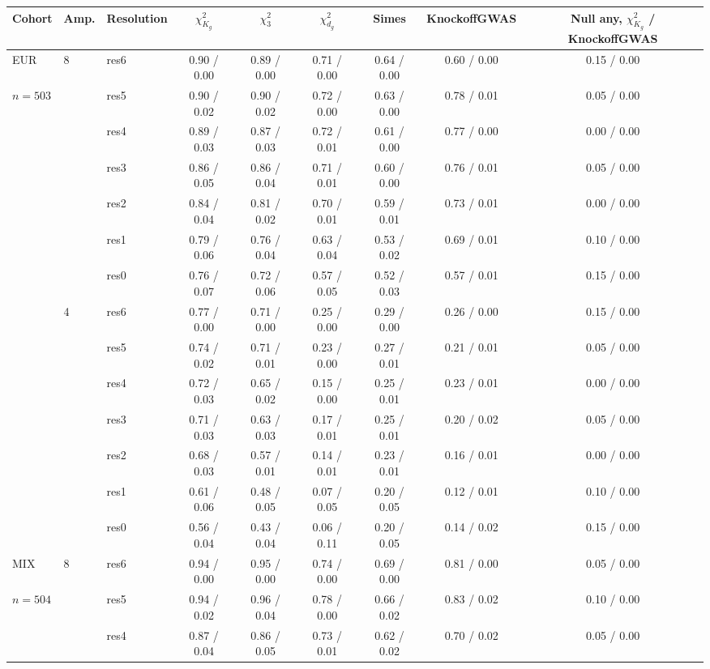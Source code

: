 \begin{tabular}{lllcccccc}
\toprule
Cohort & Amp. & Resolution & $\chi^2_{K_g}$ & $\chi^2_{3}$ & $\chi^2_{d_g}$ & Simes & KnockoffGWAS & Null any, $\chi^2_{K_g}$ / KnockoffGWAS\\
\midrule
EUR & 8 & res6 & 0.90 / 0.00 & 0.89 / 0.00 & 0.71 / 0.00 & 0.64 / 0.00 & 0.60 / 0.00 & 0.15 / 0.00\\
$n=503$ &  & res5 & 0.90 / 0.02 & 0.90 / 0.02 & 0.72 / 0.00 & 0.63 / 0.00 & 0.78 / 0.01 & 0.05 / 0.00\\
 &  & res4 & 0.89 / 0.03 & 0.87 / 0.03 & 0.72 / 0.01 & 0.61 / 0.00 & 0.77 / 0.00 & 0.00 / 0.00\\
 &  & res3 & 0.86 / 0.05 & 0.86 / 0.04 & 0.71 / 0.01 & 0.60 / 0.00 & 0.76 / 0.01 & 0.05 / 0.00\\
 &  & res2 & 0.84 / 0.04 & 0.81 / 0.02 & 0.70 / 0.01 & 0.59 / 0.01 & 0.73 / 0.01 & 0.00 / 0.00\\
 &  & res1 & 0.79 / 0.06 & 0.76 / 0.04 & 0.63 / 0.04 & 0.53 / 0.02 & 0.69 / 0.01 & 0.10 / 0.00\\
 &  & res0 & 0.76 / 0.07 & 0.72 / 0.06 & 0.57 / 0.05 & 0.52 / 0.03 & 0.57 / 0.01 & 0.15 / 0.00\\
\midrule
 & 4 & res6 & 0.77 / 0.00 & 0.71 / 0.00 & 0.25 / 0.00 & 0.29 / 0.00 & 0.26 / 0.00 & 0.15 / 0.00\\
 &  & res5 & 0.74 / 0.02 & 0.71 / 0.01 & 0.23 / 0.00 & 0.27 / 0.01 & 0.21 / 0.01 & 0.05 / 0.00\\
 &  & res4 & 0.72 / 0.03 & 0.65 / 0.02 & 0.15 / 0.00 & 0.25 / 0.01 & 0.23 / 0.01 & 0.00 / 0.00\\
 &  & res3 & 0.71 / 0.03 & 0.63 / 0.03 & 0.17 / 0.01 & 0.25 / 0.01 & 0.20 / 0.02 & 0.05 / 0.00\\
 &  & res2 & 0.68 / 0.03 & 0.57 / 0.01 & 0.14 / 0.01 & 0.23 / 0.01 & 0.16 / 0.01 & 0.00 / 0.00\\
 &  & res1 & 0.61 / 0.06 & 0.48 / 0.05 & 0.07 / 0.05 & 0.20 / 0.05 & 0.12 / 0.01 & 0.10 / 0.00\\
 &  & res0 & 0.56 / 0.04 & 0.43 / 0.04 & 0.06 / 0.11 & 0.20 / 0.05 & 0.14 / 0.02 & 0.15 / 0.00\\
\midrule
MIX & 8 & res6 & 0.94 / 0.00 & 0.95 / 0.00 & 0.74 / 0.00 & 0.69 / 0.00 & 0.81 / 0.00 & 0.05 / 0.00\\
$n=504$ &  & res5 & 0.94 / 0.02 & 0.96 / 0.04 & 0.78 / 0.00 & 0.66 / 0.02 & 0.83 / 0.02 & 0.10 / 0.00\\
 &  & res4 & 0.87 / 0.04 & 0.86 / 0.05 & 0.73 / 0.01 & 0.62 / 0.02 & 0.70 / 0.02 & 0.05 / 0.00\\

\end{tabular}
